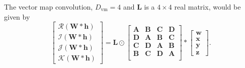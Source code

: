 \documentclass[14pt,a4paper]{article}
\begin{document}
The vector map convolution, $D_\mathrm{vm} = 4$ and $\textbf{L}$ is a $4\times4$ real matrix, would be given by
\begin{equation}
\begin{bmatrix}
 \mathscr{R}(\textbf{W}\ast \textbf{h}) \\ 
 \mathscr{I}(\textbf{W}\ast \textbf{h}) \\
 \mathscr{J}(\textbf{W}\ast \textbf{h}) \\
 \mathscr{K}(\textbf{W}\ast \textbf{h}) 
\end{bmatrix}
=
\mathbf{L}\odot
\begin{bmatrix}
 \textbf{A} & \textbf{B} & \textbf{C} & \textbf{D} \\
 \textbf{D} & \textbf{A} & \textbf{B} & \textbf{C} \\
 \textbf{C} & \textbf{D} & \textbf{A} & \textbf{B} \\
 \textbf{B} & \textbf{C} & \textbf{D} & \textbf{A} \\
\end{bmatrix}
\ast
\begin{bmatrix}
 \textbf{w} \\ 
 \textbf{x} \\
 \textbf{y} \\
 \textbf{z}
\end{bmatrix} .
\label{e:vmapconv}
\end{equation}
\end{document}
